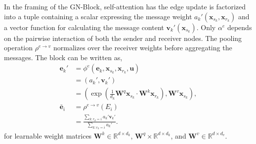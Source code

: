 In the framing of the GN-Block, self-attention has the edge update is factorized into a tuple containing a scalar expressing the message weight $a_k'(\mathbf{x}_{s_k}, \mathbf{x}_{r_k})$ and a vector function for calculating the message content $\mathbf{v}_k'(\mathbf{x}_{s_k})$.
Only $\alpha^e$ depends on the pairwise interaction of both the sender and receiver nodes.
The pooling operation $\rho^{e \to v}$ normalizes over the receiver weights before aggregating the messages.
The block can be written as,
\begin{equation}
    \begin{aligned}
        \mathbf{e}_k' &= \phi^e(\mathbf{e}_k, \mathbf{x}_{s_k}, \mathbf{x}_{r_k}, \mathbf{u}) \\
        &= ( a_k', \mathbf{v}_k' ) \\
        &= \left( \exp \left( \frac{1}{d_k} \mathbf{W}^q \mathbf{x}_{s_k} \cdot \mathbf{W}^k \mathbf{x}_{r_k} \right), \mathbf{W}^v \mathbf{x}_{s_k} \right), \\
        \mathbf{\bar{e}}_i &= \rho^{e \to v}(E_i) \\
       &= \frac{\sum_{k: r_k = i} a_k' \mathbf{v}_k'}{\sum_{k: r_k = i} a_k'}.
    \end{aligned}
\end{equation}
for learnable weight matrices $\mathbf{W}^k \in \mathbb{R}^{d \times d_k}$, $\mathbf{W}^q \times \mathbb{R}^{d \times d_k}$, and $\mathbf{W}^v \in \mathbb{R}^{d \times d_v}$.

